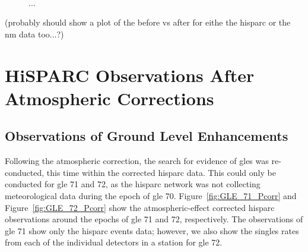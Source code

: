 \begin{figure}[ht]
	\centering
	 \\
	
	\caption{...}
	\label{fig:CR_V_T}
\end{figure}

 
(probably should show a plot of the before vs after for eithe the hisparc or the nm data too...?)
 

\section{HiSPARC Observations After Atmospheric Corrections}\label{sec:HS_obs_Pcorr}


\subsection{Observations of Ground Level Enhancements}

Following the atmospheric correction, the search for evidence of \glspl{gle} was re-conducted, this time within the corrected \gls{hisparc} data. This could only be conducted for \gls{gle} 71 and 72, as the \gls{hisparc} network was not collecting meteorological data during the epoch of \gls{gle} 70. Figure~\ref{fig:GLE_71_Pcorr} and Figure~\ref{fig:GLE_72_Pcorr} show the atmospheric-effect corrected \gls{hisparc} observations around the epochs of \gls{gle} 71 and 72, respectively. The observations of \gls{gle} 71 show only the \gls{hisparc} events data; however, we also show the singles rates from each of the individual detectors in a station for \gls{gle} 72.

